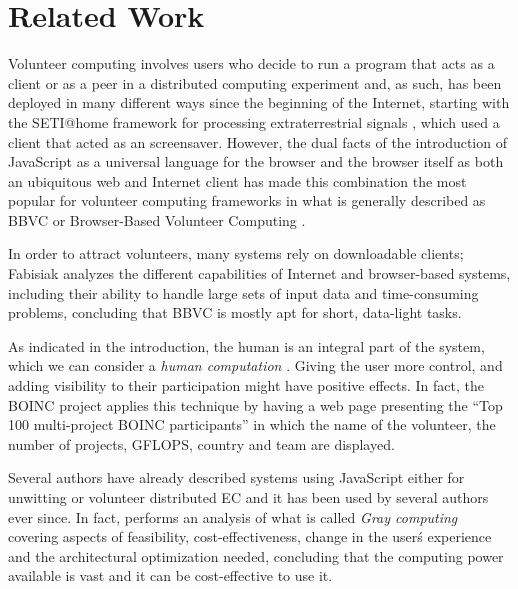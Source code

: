 \documentclass{llncs}
\begin{document}
\section{Related Work}
\label{sec:soa}

Volunteer computing involves users who decide to run a program that acts
as a client or as a peer in a distributed computing experiment
and, as such, has been deployed in many different ways since the
beginning of the Internet, starting with the SETI@home framework for
processing extraterrestrial signals \cite{david-seti:home}, which used
a client that acted as an screensaver.%
However,
the dual facts of the introduction of JavaScript as a universal language for the
browser and the browser itself as both an ubiquitous web and Internet client has
made this combination the most popular for volunteer computing
frameworks in what is generally described as BBVC or Browser-Based
Volunteer Computing \cite{fabisiak2017browser}.


In order to attract volunteers, many systems rely on downloadable clients;
Fabisiak \cite{fabisiak2017browser}
analyzes the different capabilities of Internet and browser-based
systems, including their ability to handle large sets of input data
and time-consuming problems, concluding that BBVC is mostly apt for
short, data-light tasks.

As indicated in the introduction, the human is an integral part of the system, which we can consider a {\em human computation} \cite{quinn2011human}. Giving the user more control, and adding visibility to their participation might have positive effects. In fact, the BOINC project applies this technique by having a web page presenting the ``Top 100 multi-project BOINC participants'' in which the name of the volunteer, the number of projects, GFLOPS, country and team are displayed. %

Several authors have already described systems using JavaScript either
for unwitting
\cite{unwitting-ec,boldrin2007distributed,apolonia2012enhancing} or volunteer
\cite{langdon:2005:metas,gecco07:workshop:dcor} distributed EC and it has been used by several
authors ever since. In
fact, \cite{pan2015gray} performs an analysis of what
is called {\em Gray computing} covering aspects of
feasibility, cost-effectiveness, change in the user\'s experience and the
architectural optimization needed, concluding that the computing power
available is vast and it can be cost-effective to use it.
\end{document}
